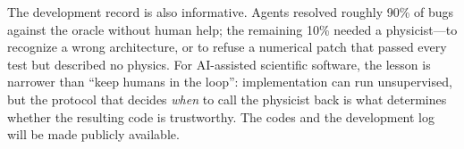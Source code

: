 \documentclass{article}
\begin{document}
The development record is also informative.
Agents resolved roughly 90\% of bugs against the oracle without human help; the remaining 10\% needed a physicist---to recognize a wrong architecture, or to refuse a numerical patch that passed every test but described no physics.
For AI-assisted scientific software, the lesson is narrower than ``keep humans in the loop'': implementation can run unsupervised, but the protocol that decides \emph{when} to call the physicist back is what determines whether the resulting code is trustworthy.
The codes and the development log will be made publicly available.



\end{document}
